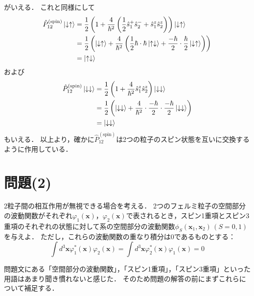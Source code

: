 \documentclass[a4paper,11pt]{jsarticle}
\begin{document}
がいえる．
これと同様にして
\begin{align}
  \hat{P}^{(\mathrm{spin})}_{12} \ket{\downarrow \uparrow} &=  \frac{1}{2}\left(1 + \frac{4}{\hbar^2} \left(\frac{1}{2}\hat{s}^{+}_1 \hat{s}^{-}_2 + \hat{s}^z_1 \hat{s}^z_2 \right)\right) \ket{\downarrow \uparrow} \notag\\
  &= \frac{1}{2}\left(\ket{\downarrow \uparrow} + \frac{4}{\hbar^2}\left(\frac{1}{2}\hbar\cdot\hbar \ket{\uparrow \downarrow} + \frac{-\hbar}{2} \cdot\frac{\hbar}{2}\ket{\downarrow \uparrow}\right)  \right) \notag\\
  &= \ket{\uparrow \downarrow}
\end{align}
および
\begin{align}
  \hat{P}^{(\mathrm{spin})}_{12} \ket{\downarrow \downarrow} &= \frac{1}{2}\left(1 + \frac{4}{\hbar^2} \hat{s}^z_1 \hat{s}^z_2 \right) \ket{\downarrow \downarrow} \notag\\
  &= \frac{1}{2}\left(\ket{\downarrow \downarrow} + \frac{4}{\hbar^2} \cdot\frac{-\hbar}{2} \cdot\frac{-\hbar}{2} \ket{\downarrow \downarrow}\right) \notag\\
  &= \ket{\downarrow \downarrow}
\end{align}
もいえる．
以上より，確かに$\hat{P}^{(\mathrm{spin})}_{12}$は2つの粒子のスピン状態を互いに交換するように作用している．

\section{問題(2)}
\begin{tcolorbox}[title=問題(2)]
  2粒子間の相互作用が無視できる場合を考える．
  2つのフェルミ粒子の空間部分の波動関数がそれぞれ$\varphi_1(\bm{x})$，$\varphi_2(\bm{x})$で表されるとき，スピン1重項とスピン3重項のそれぞれの状態に対して系の空間部分の波動関数$\phi_S(\bm{x}_1, \bm{x}_2)\,(S=0,1)$を与えよ．
  ただし，これらの波動関数の重なり積分は0であるものとする：
  \begin{equation}
    \int d^3\bm{x} \varphi_1^{\ast}(\bm{x}) \varphi_2(\bm{x}) = \int d^3\bm{x} \varphi_2^{\ast}(\bm{x}) \varphi_1(\bm{x}) = 0
    \label{overlap}
  \end{equation} 
\end{tcolorbox}

問題文にある「空間部分の波動関数」，「スピン1重項」，「スピン3重項」といった用語はあまり聞き慣れないと感じた．
そのため問題の解答の前にまずこれらについて補足する．
\end{document}
